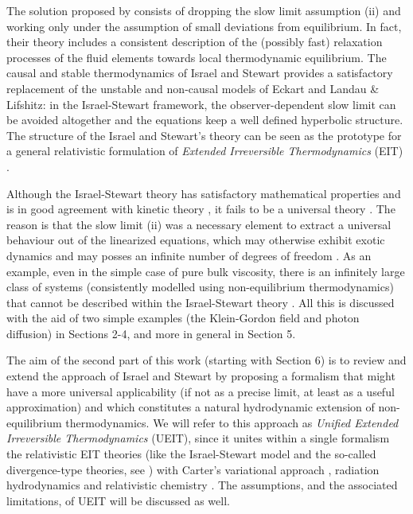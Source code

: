 \documentclass[a4paper, amsfonts, amssymb, amsmath, reprint, twocolumn, showkeys, nofootinbib]{revtex4-2}
\begin{document}
The solution proposed by \citet{Israel_Stewart_1979} consists of dropping the slow limit assumption (ii) and working only under the assumption of small deviations from equilibrium. In fact, their theory includes a consistent description of the (possibly fast) relaxation processes of the fluid elements towards local thermodynamic equilibrium. The causal and stable thermodynamics of Israel and Stewart provides a satisfactory replacement of the unstable and non-causal models of Eckart and Landau \& Lifshitz: in the Israel-Stewart framework, the observer-dependent slow limit can be avoided altogether and the equations keep a well defined hyperbolic structure. The structure of the Israel and Stewart's theory can be seen as the prototype for a general relativistic formulation of \emph{Extended Irreversible Thermodynamics} (EIT) \citep{Jou_Extended,rezzolla_book}. 
 
Although the Israel-Stewart theory has satisfactory mathematical properties \citep{Hishcock1983} and is in good agreement with kinetic theory \citep{Israel_Stewart_1979}, it fails to be a universal theory \citep{Salazar2020}. The reason is that the slow limit (ii) was a necessary element to extract a universal behaviour out of the linearized equations, which may otherwise exhibit exotic dynamics \citep{Denicol2012Boltzmann,Heller2014} and may posses an infinite number of degrees of freedom \citep{Denicol_Relaxation_2011}. 
As an example, even in the simple case of pure bulk viscosity, there is an infinitely large class of systems (consistently modelled using non-equilibrium thermodynamics) that cannot be described within the Israel-Stewart theory \citep{BulkGavassino}. All this is discussed with the aid of two simple examples (the Klein-Gordon field and photon diffusion) in Sections 2-4, and more in general in Section 5.

The aim of the second part of this work (starting with Section 6) is to review and extend the approach of Israel and Stewart by proposing a formalism that might have a more universal applicability (if not as a precise limit, at least as a useful approximation) and which constitutes a natural hydrodynamic extension of non-equilibrium thermodynamics. We will refer to this approach as \textit{Unified Extended Irreversible Thermodynamics} (UEIT), since it unites within a single formalism the relativistic EIT theories (like the Israel-Stewart model and the so-called divergence-type theories, see \citet{Liu1986}) with Carter's variational approach \citep{carter1991,Carter_starting_point}, radiation hydrodynamics \citep{mihalas_book} and relativistic chemistry \citep{noto_rel}. 
The assumptions, and the associated limitations, of UEIT will be discussed as well.
\end{document}
